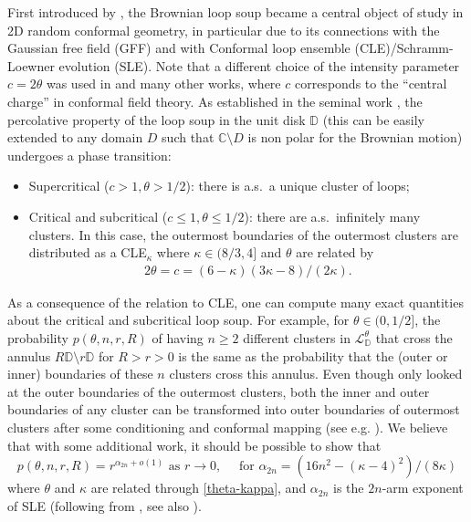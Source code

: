 \documentclass[11pt]{article}
\theoremstyle{remark}
\newcommand{\C}{\mathbb{C}}
\newcommand{\D}{\mathbb{D}}
\newcommand{\Lc}{\mathcal{L}}
\numberwithin{equation}{section}
\begin{document}
First introduced by \cite{Lawler04}, the Brownian loop soup became a central object of study in 2D random conformal geometry, in particular due to its connections with the Gaussian free field (GFF) and with Conformal loop ensemble (CLE)/Schramm-Loewner evolution (SLE).
Note that a different choice of the intensity parameter $c=2\theta$ was used in \cite{Lawler04, SheffieldWernerCLE} and many other works, where $c$ corresponds to the ``central charge'' in conformal field theory. 
As established in the seminal work \cite{SheffieldWernerCLE}, the percolative property of the loop soup in the unit disk $\D$ (this can be easily extended to any domain $D$ such that $\C\setminus D$ is non polar for the Brownian motion) undergoes a phase transition:
\begin{itemize}
\item
Supercritical ($c>1, \theta>1/2$): there is a.s.\ a unique cluster of loops;
\item
Critical and subcritical ($c\le 1, \theta \leq 1/2$): there are a.s.\ infinitely many clusters. In this case, the outermost boundaries of the outermost clusters are distributed as a  CLE$_\kappa$ where $\kappa \in (8/3,4]$ and $\theta$ are related by
\begin{align}\label{theta-kappa}
2\theta=c=(6-\kappa)(3\kappa-8)/(2\kappa).
\end{align}
\end{itemize}
As a consequence of the relation to CLE, one can compute many exact quantities about the critical and subcritical loop soup. 
For example, for $\theta\in(0,1/2]$, the probability $p(\theta, n,r,R)$ of having $n\ge 2$ different clusters in $\Lc_\D^\theta$ that cross the annulus $R\D \setminus r\D$ for $R>r>0$ is the same as the probability that the (outer  or inner) boundaries of these $n$ clusters cross this annulus.
Even though \cite{SheffieldWernerCLE} only looked at the outer boundaries of the outermost clusters, both the inner and outer boundaries of any cluster can be transformed into outer boundaries of outermost clusters after some conditioning and conformal mapping (see e.g. \cite[Section 7]{GaoLiQian2022mutliple}).
We believe that with some additional work, it should be possible to show that 
\[p(\theta, n,r,R)=r^{\alpha_{2n}+o(1)} \text{ as } r\to 0, \quad \text{ for } \alpha_{2n}=(16n^2-(\kappa-4)^2)/(8\kappa)\]
where $\theta$ and $\kappa$ are related through \eqref{theta-kappa}, and $\alpha_{2n}$ is the $2n$-arm exponent of SLE (following from \cite{MR1879816,MR1879850,MR1879851,MR1899232}, see also \cite{wu2018arms}).
\end{document}
